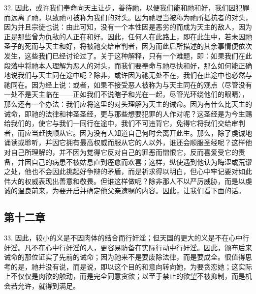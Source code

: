 32. 因此，或许我们奉命向天主让步，善待祂，以便我们能和祂和好，我们因犯罪而远离了祂，以致祂可被称为我们的对头。因为祂理当被称为祂所抵抗者的对头，因为并且宗徒也说：由此可知，没有一个本性因是恶劣的而成为天主的敌人，因为正是那些曾为仇敌的人正在和好。因此，任何人在此路上，即在此生中，若未因祂圣子的死而与天主和好，将被祂交给审判者，因为而此后所描述的其余事情便依次发生，这些我们已经讨论过了。关于这种解释，只有一个难题，即：如果我们在此段落中将祂本人理解为恶人的对头，而我们要奉命与祂尽快和好，那么如何能正确地说我们与天主同在途中呢？除非，或许因为祂无处不在，我们在此途中也必然与祂同在。因为经上说：或者，如果不接受恶人被称为与天主同在的观点（尽管没有一处不是天主临在——正如我们不说瞎子和光在一起，尽管光环绕他们的眼睛），那么还有一个办法：我们应将这里的对头理解为天主的诫命。因为有什么比天主的诫命，即祂的法律和神圣圣经，更与那些想要犯罪的人作对呢？这圣经是为今生赐给我们的，使它与我们一同行在途中，我们不可违背它，免得它将我们交给审判者，而应当赶快顺从它。因为没有人知道自己何时会离开此生。那么，除了虔诚地诵读或聆听，并因它拥有最高权威而服从它的人以外，谁还会顺服圣经呢？这样他对自己所理解的，并不因为觉得它反对自己的罪恶而憎恨它，反而喜爱受它的责备，并因自己的病患不被姑息直到痊愈而欢喜；这样，纵使遇到他认为晦涩或荒谬之处，他也不会因此挑起好争辩的矛盾，而是祈求得以明白，但心中牢记要对如此伟大的权威表现出善意和敬畏。但谁这样做呢？除非那人不以严厉威胁，而是以虔诚的温良前来，为要开启并确定他父亲遗嘱的内容。因此，让我们看下面的话。\par


\subsection{第十二章}

33. 因此，较小的义是不因肉体的结合而行奸淫；但天国的更大的义是不在心中行奸淫。凡不在心中行奸淫的人，更容易防备在实际行动中行奸淫。因此，颁布后来诫命的那位证实了先前的诫命；因为祂来不是要废除法律，而是要成全。很值得思考的是，祂并没有说，而是说，即以这个目的和意向转向她，为要贪恋她；这实际上不仅仅是肉欲的触动，而是完全同意贪欲；以至于禁止的欲望不被抑制，而是机会若允许，就得到满足。\par

